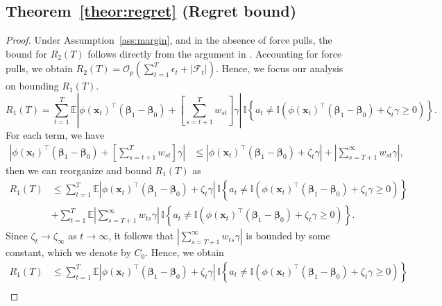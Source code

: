 \documentclass[12pt]{article}
\begin{document}
\subsection{Theorem~\ref{theor:regret} (Regret bound)}
\label{app:regret}

\begin{proof}
Under Assumption~\ref{ass:margin}, and in the absence of force pulls, the bound for $R_2(T)$ follows directly from the argument in \citet{chen2021}. Accounting for force pulls, we obtain $R_2(T) = \mathcal{O}_p\left(\sum_{t=1}^T \epsilon_t + |\mathcal{F}_t|\right)$. Hence, we focus our analysis on bounding $R_1(T)$.
\begin{equation*}
    R_1(T) = \sum_{t=1}^{T} \mathbb{E} \left|\phi(\bm{x}_t)^{\top} (\bm{\beta}_1 - \bm{\beta}_0) + \left[\sum_{s=t+1}^T w_{st} \right] \gamma \right| \, \mathbb{I} \left\{ a_t \neq \mathbb{I} \left(\phi(\bm{x}_t)^{\top} (\bm{\beta}_1 - \bm{\beta}_0) + \zeta_t \gamma \ge 0\right) \right\}.
\end{equation*}
For each term, we have
\begin{align*}
    \left|\phi(\bm{x}_t)^{\top} (\bm{\beta}_1 - \bm{\beta}_0) + \left[\sum_{s=t+1}^T w_{st} \right] \gamma \right| 
    &\le \left|\phi(\bm{x}_t)^{\top} (\bm{\beta}_1 - \bm{\beta}_0) + \zeta_t \gamma \right| + \left| \sum_{s=T+1}^\infty w_{st} \gamma \right|,
\end{align*}
then we can reorganize and bound $R_1(T)$ as 
\begin{align*}
    R_1(T) &\le \sum_{t=1}^{T} \mathbb{E} \left|\phi(\bm{x}_t)^{\top} (\bm{\beta}_1 - \bm{\beta}_0) + \zeta_t \gamma \right| \, \mathbb{I} \left\{ a_t \neq \mathbb{I} \left(\phi(\bm{x}_t)^{\top} (\bm{\beta}_1 - \bm{\beta}_0) + \zeta_t \gamma \ge 0 \right) \right\} \\
    &+ \sum_{t=1}^{T} \mathbb{E} \left|\sum_{s=T+1}^\infty w_{ts} \gamma \right| \, \mathbb{I} \left\{ a_t \neq \mathbb{I} \left(\phi(\bm{x}_t)^{\top} (\bm{\beta}_1 - \bm{\beta}_0) + \zeta_t \gamma \ge 0 \right) \right\}.
\end{align*}
Since $\zeta_t \to \zeta_\infty$ as $t \to \infty$, it follows that $\left|\sum_{s=T+1}^\infty w_{ts}\gamma\right|$ is bounded by some constant, which we denote by $C_0$. Hence, we obtain
\begin{align*}
    R_1(T) &\le \sum_{t=1}^{T} \mathbb{E} \left|\phi(\bm{x}_t)^{\top} (\bm{\beta}_1 - \bm{\beta}_0) + \zeta_t \gamma \right| \, \mathbb{I} \left\{ a_t \neq \mathbb{I} \left(\phi(\bm{x}_t)^{\top} (\bm{\beta}_1 - \bm{\beta}_0) + \zeta_t \gamma \ge 0 \right) \right\} \\

\end{align*}
\end{proof}
\end{document}
